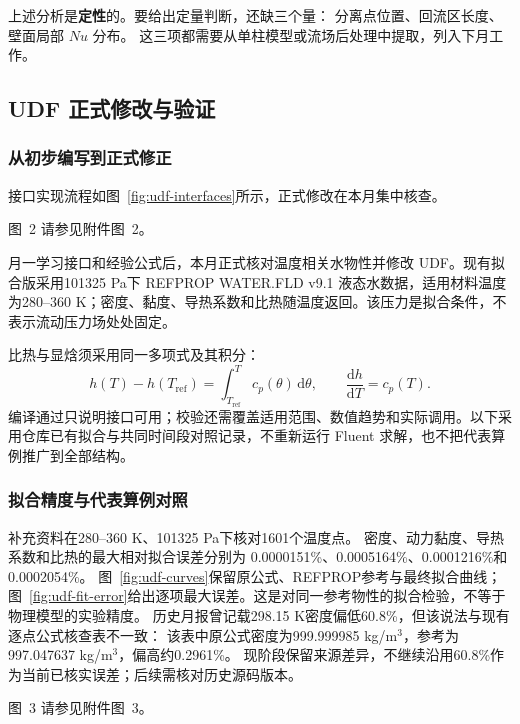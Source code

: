 \documentclass[stage2,fontset=fandol]{ydzjreport}
\makeatletter
\newcommand{\submissionnumber}[1]{\def\@currentlabel{#1}}
\makeatother
\begin{document}
上述分析是\textbf{定性}的。要给出定量判断，还缺三个量：
分离点位置、回流区长度、壁面局部 $Nu$ 分布。
这三项都需要从单柱模型或流场后处理中提取，列入下月工作。

\subsection{UDF 正式修改与验证}
\subsubsection{从初步编写到正式修正}
接口实现流程如图~\ref{fig:udf-interfaces}所示，正式修改在本月集中核查。

\par\noindent \begingroup\submissionnumber{2}\label{fig:udf-interfaces}\endgroup 图~2 请参见附件图~2。\par


月一学习接口和经验公式后，本月正式核对温度相关水物性并修改 UDF。现有拟合版采用101325 Pa下 REFPROP WATER.FLD v9.1 液态水数据，适用材料温度为280--360 K；密度、黏度、导热系数和比热随温度返回。该压力是拟合条件，不表示流动压力场处处固定。

比热与显焓须采用同一多项式及其积分：
\begin{equation}
h(T)-h(T_{\mathrm{ref}})=\int_{T_{\mathrm{ref}}}^{T}c_p(\theta)\,\mathrm d\theta,
\qquad \frac{\mathrm dh}{\mathrm dT}=c_p(T).
\end{equation}
编译通过只说明接口可用；校验还需覆盖适用范围、数值趋势和实际调用。以下采用仓库已有拟合与共同时间段对照记录，不重新运行 Fluent 求解，也不把代表算例推广到全部结构。
\subsubsection{拟合精度与代表算例对照}
补充资料在280--360 K、101325 Pa下核对1601个温度点。
密度、动力黏度、导热系数和比热的最大相对拟合误差分别为
0.0000151\%、0.0005164\%、0.0001216\%和0.0002054\%。
图~\ref{fig:udf-curves}保留原公式、REFPROP参考与最终拟合曲线；
图~\ref{fig:udf-fit-error}给出逐项最大误差。这是对同一参考物性的拟合检验，不等于物理模型的实验精度。
历史月报曾记载298.15 K密度偏低60.8\%，但该说法与现有逐点公式核查表不一致：
该表中原公式密度为999.999985 kg/m$^3$，参考为997.047637 kg/m$^3$，偏高约0.2961\%。
现阶段保留来源差异，不继续沿用60.8\%作为当前已核实误差；后续需核对历史源码版本。


\par\noindent \begingroup\submissionnumber{3}\label{fig:udf-curves}\endgroup 图~3 请参见附件图~3。\par
\end{document}
